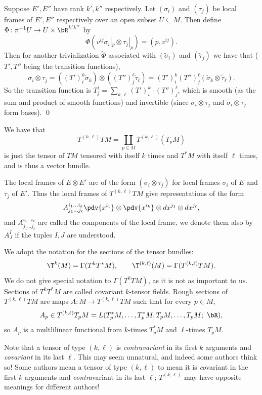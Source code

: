     Suppose $E',E''$ have rank $k',k''$ respectively.
    Let $(\sigma_i)$ and $(\tau_j)$ be local frames of $E',E''$ respectively over an open subset $U\subseteq M$.
    Then define $\Phi\colon\pi^{-1}U\to U\times\bR^{k'k''}$ by
    $$ \Phi(v^{ij}\sigma_i|_p\otimes\tau_j|_p) = (p,v^{ij}) . $$
    Then for another trivialization $\tilde\Phi$ associated with $(\tilde\sigma_i)$ and $(\tilde\tau_j)$ we have that ($T',T''$ being the transition functions),
    $$ \sigma_i\otimes\tau_j = ((T')^k_i\tilde\sigma_k)\otimes((T'')^\ell_j\tilde\tau_\ell) = (T')^k_i(T'')^\ell_j(\tilde\sigma_k\otimes\tilde\tau_\ell) . $$
    So the transition function is $T^i_j=\sum_{k,\ell}(T')^k_i\cdot(T'')^\ell_j$, which is smooth (as the sum and product of smooth functions) and invertible
    (since $\sigma_i\otimes\tau_j$ and $\tilde\sigma_i\otimes\tilde\tau_j$ form bases).
    \qed

\eproof

We have that
$$ T^{(k,\ell)}TM = \coprod_{p\in M}T^{(k,\ell)}(T_pM) $$
is just the tensor of $TM$ tensored with itself $k$ times and $T^*M$ with itself $\ell$ times, and is thus a vector bundle.

The local frames of $E\otimes E'$ are of the form $(\sigma_i\otimes\tau_j)$ for local frames $\sigma_i$ of $E$ and $\tau_j$ of $E'$.
Thus the local frames of $T^{(k,\ell)}TM$ give representations of the form
$$ A^{i_1\dots i_k}_{j_1\dots j_\ell}\pdv{x^{i_1}}\otimes\pdv{x^{i_k}}\otimes dx^{j_1}\otimes dx^{j_\ell} , $$
and $A^{i_1\dots i_k}_{j_1\dots j_\ell}$ are called the {\emphcolor components} of the local frame, we denote them also by $A^I_J$ if the tuples $I,J$ are understood.

We adopt the notation for the sections of the tensor bundles:
$$ \T^k(M) = \Gamma(T^kT^*M),\qquad \T^{(k,\ell)}(M) = \Gamma(T^{(k,\ell)}TM) . $$
We do not give special notation to $\Gamma(T^kTM)$, as it is not as important to us.
Sections of $T^kT^*M$ are called {\emphcolor covariant $k$-tensor fields}.
Rough sections of $T^{(k,\ell)}TM$ are maps $A\colon M\to T^{(k,\ell)}TM$ such that for every $p\in M$,
$$ A_p\in T^{(k,\ell)}T_pM = L(T_p^*M,\dots,T_p^*M,T_pM,\dots,T_pM;\ \bR) , $$
so $A_p$ is a multlilinear functional from $k$-times $T_p^*M$ and $\ell$-times $T_pM$.

\bnote

    Note that a tensor of type $(k,\ell)$ is {\it contravariant\/} in its first $k$ arguments and {\it covariant\/} in its last $\ell$.
    This may seem unnatural, and indeed some authors think so!
    Some authors mean a tensor of type $(k,\ell)$ to mean it is {\it co}variant in the first $k$ arguments and {\it contra}variant in its last
    $\ell$; $T^{(k,\ell)}$ may have opposite meanings for different authors!

